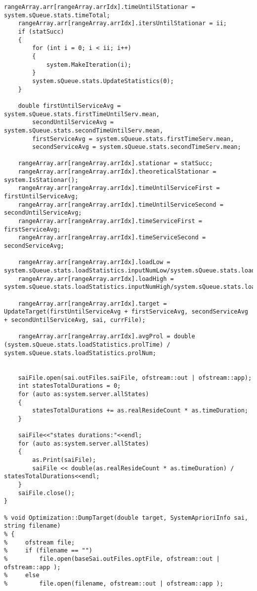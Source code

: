 \begin{lstlisting}[language={[ISO]C++}]
    rangeArray.arr[rangeArray.arrIdx].timeUntilStationar = system.sQueue.stats.timeTotal;
    rangeArray.arr[rangeArray.arrIdx].itersUntilStationar = ii;
    if (statSucc)
    {
        for (int i = 0; i < ii; i++)
        {
            system.MakeIteration(i);
        }
        system.sQueue.stats.UpdateStatistics(0);
    }

    double firstUntilServiceAvg = system.sQueue.stats.firstTimeUntilServ.mean,
        secondUntilServiceAvg = system.sQueue.stats.secondTimeUntilServ.mean,
        firstServiceAvg = system.sQueue.stats.firstTimeServ.mean,
        secondServiceAvg = system.sQueue.stats.secondTimeServ.mean;
    
    rangeArray.arr[rangeArray.arrIdx].stationar = statSucc;
    rangeArray.arr[rangeArray.arrIdx].theoreticalStationar = system.IsStationar();
    rangeArray.arr[rangeArray.arrIdx].timeUntilServiceFirst = firstUntilServiceAvg;
    rangeArray.arr[rangeArray.arrIdx].timeUntilServiceSecond = secondUntilServiceAvg;
    rangeArray.arr[rangeArray.arrIdx].timeServiceFirst = firstServiceAvg;
    rangeArray.arr[rangeArray.arrIdx].timeServiceSecond = secondServiceAvg;
    
    rangeArray.arr[rangeArray.arrIdx].loadLow = system.sQueue.stats.loadStatistics.inputNumLow/system.sQueue.stats.loadStatistics.theoreticalNumLow;
    rangeArray.arr[rangeArray.arrIdx].loadHigh = system.sQueue.stats.loadStatistics.inputNumHigh/system.sQueue.stats.loadStatistics.theoreticalNumHigh;
    
    rangeArray.arr[rangeArray.arrIdx].target = UpdateTarget(firstUntilServiceAvg + firstServiceAvg, secondServiceAvg + secondUntilServiceAvg, sai, currFile);

    rangeArray.arr[rangeArray.arrIdx].avgProl = double (system.sQueue.stats.loadStatistics.prolTime) / system.sQueue.stats.loadStatistics.prolNum;
    
    
    saiFile.open(sai.outFiles.saiFile, ofstream::out | ofstream::app);
    int statesTotalDurations = 0;
    for (auto as:system.server.allStates)
    {
        statesTotalDurations += as.realResideCount * as.timeDuration;
    }

    saiFile<<"states durations:"<<endl;
    for (auto as:system.server.allStates)
    {
        as.Print(saiFile);
        saiFile << double(as.realResideCount * as.timeDuration) / statesTotalDurations<<endl;
    }
    saiFile.close();
}

% void Optimization::DumpTarget(double target, SystemAprioriInfo sai, string filename)
% {
%     ofstream file;
%     if (filename == "")
%         file.open(baseSai.outFiles.optFile, ofstream::out | ofstream::app );
%     else
%         file.open(filename, ofstream::out | ofstream::app );


\end{lstlisting}
